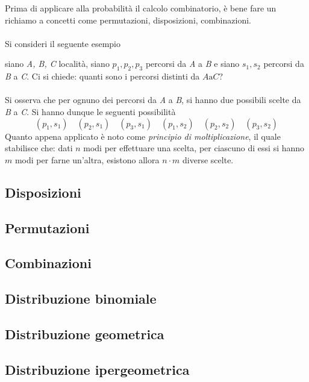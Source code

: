 \documentclass{subfiles}
\begin{document}
Prima di applicare alla probabilità il calcolo combinatorio, è bene fare un richiamo a concetti come permutazioni, disposizioni, combinazioni.
\\ \\
Si consideri il seguente esempio
\begin{Example*}
    siano \emph{A, B, C} località, siano \(p_{1}, p_{2}, p_{3}\) percorsi da \emph{A} a \emph{B}  e siano \(s_{1}, s_{2}\) percorsi da \emph{B} a \emph{C}.
    Ci si chiede: quanti sono i percorsi distinti da \(A \text{a} C\)?
    \\ \\
    Si osserva che per ognuno dei percorsi da \emph{A} a \emph{B}, si hanno due possibili scelte da \emph{B} a \emph{C}.
    Si hanno dunque le seguenti possibilità
    \[
        (p_{1}, s_{1}) \quad (p_{2}, s_{1}) \quad (p_{3}, s_{1}) \quad (p_{1}, s_{2}) \quad (p_{2}, s_{2}) \quad (p_{3}, s_{2})
    \]
    Quanto appena applicato è noto come \emph{principio di moltiplicazione}, il quale stabilisce che:
    dati \(n\) modi per effettuare una scelta, per ciascuno di essi si hanno \(m\) modi per farne un'altra, esistono allora \(n \cdot m\) diverse scelte.
\end{Example*}

\subsection{Disposizioni}


\subsection{Permutazioni}


\subsection{Combinazioni}


\subsection{Distribuzione binomiale}


\subsection{Distribuzione geometrica}


\subsection{Distribuzione ipergeometrica}

\end{document}
